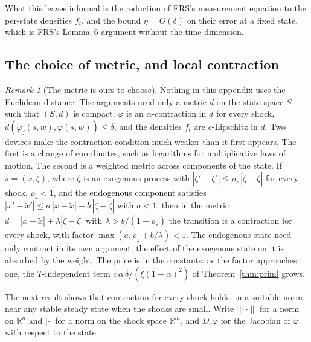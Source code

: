 \documentclass[11pt]{article}
\theoremstyle{definition}
\theoremstyle{remark}
\newtheorem{remark}[theorem]{Remark}
\newcommand{\R}{\mathbb{R}}
\begin{document}
\noindent What this leaves informal is the reduction of FRS's measurement equation to the
per-state densities $f_t$, and the bound $\eta = O(\delta)$ on their error at a fixed state, which
is FRS's Lemma~6 argument without the time dimension.

\subsection{The choice of metric, and local contraction}

\begin{remark}[The metric is ours to choose]\label{rem:metric}
Nothing in this appendix uses the Euclidean distance. The arguments need only a metric $d$ on the
state space $S$ such that $(S,d)$ is compact, $\varphi$ is an $\alpha$-contraction in $d$ for every
shock, $d(\varphi_j(s,w), \varphi(s,w)) \le \delta$, and the densities $f_t$ are $c$-Lipschitz in
$d$. Two devices make the contraction condition much weaker than it first appears. The first is a
change of coordinates, such as logarithms for multiplicative laws of motion. The second is a
weighted metric across components of the state. If $s = (x, \zeta)$, where $\zeta$ is an
exogenous process with $|\zeta' - \tilde\zeta'| \le \rho_z\,|\zeta - \tilde\zeta|$ for every
shock, $\rho_z < 1$, and the endogenous component satisfies
$|x' - \tilde x'| \le a\,|x - \tilde x| + b\,|\zeta - \tilde\zeta|$ with $a < 1$, then in the
metric $d = |x - \tilde x| + \lambda|\zeta - \tilde\zeta|$ with $\lambda > b/(1-\rho_z)$ the
transition is a contraction for every shock, with factor $\max(a, \rho_z + b/\lambda) < 1$. The
endogenous state need only contract in its own argument; the effect of the exogenous state on it
is absorbed by the weight. The price is in the constants: as the factor approaches one, the
$T$-independent term $c\,\alpha\,\delta/(\xi(1-\alpha)^2)$ of Theorem~\ref{thm:prim} grows.
\end{remark}

The next result shows that contraction for every shock holds, in a suitable norm, near any stable
steady state when the shocks are small. Write $\|\cdot\|$ for a norm on $\R^n$ and $|\cdot|$ for a
norm on the shock space $\R^m$, and $D_s\varphi$ for the Jacobian of $\varphi$ with respect to the
state.
\end{document}
